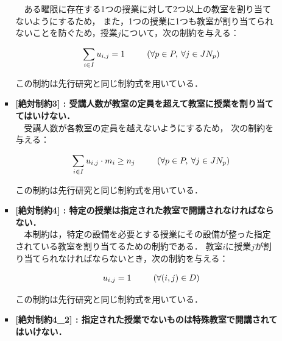 \documentclass[12pt, a4paper, fleqn]{jreport}
\begin{document}
\begin{itemize}
\begin{itemize}
\begin{itemize}
\vspace{-5.0mm}
　ある曜限に存在する1つの授業に対して2つ以上の教室を割り当てないようにするため，
また，1つの授業に1つも教室が割り当てられないことを防ぐため，授業$j$について，次の制約を与える：

\vspace{-3.0mm}
\begin{eqnarray}
\label{hzettai2} 
&&\sum_{i \in I} u_{i,j} = 1 \hspace{5.0mm}
\quad \left (\forall p \in P, \: \forall j \in JN_{p} \right)
\end{eqnarray} 

\vspace{5.0mm}
この制約は先行研究と同じ制約式を用いている．
\vspace{3.0mm}
\item {\bf  [絶対制約3] : 受講人数が教室の定員を超えて教室に授業を割り当ててはいけない．}\\

\vspace{-5.0mm}
　受講人数が各教室の定員を越えないようにするため，
次の制約を与える：

\vspace{-3.0mm}
\begin{eqnarray}
\label{hzettai3} 
&&\sum_{i \in I} u_{i,j}\cdot m_{i} \geq n_{j} \hspace{5.0mm}
\quad \left (\forall p \in P, \: \forall j \in JN_{p}\right)
\end{eqnarray}

\vspace{5.0mm}
この制約は先行研究と同じ制約式を用いている．
\vspace{3.0mm}
\item {\bf  [絶対制約4] : 特定の授業は指定された教室で開講されなければならない．}\\

\vspace{-5.0mm}
　本制約は，特定の設備を必要とする授業にその設備が整った指定されている教室を割り当てるための制約である．
教室$i$に授業$j$が割り当てられなければならないとき，次の制約を与える：

\vspace{-3.0mm}
\label{hzettai4} 
\begin{eqnarray}
&&u_{i,j} = 1 \hspace{5.0mm}
\quad \left(\forall (i,j) \in D\right)
\end{eqnarray}

\vspace{5.0mm}
この制約は先行研究と同じ制約式を用いている．
\vspace{3.0mm}
\item {\bf  [絶対制約4\_2] : 指定された授業でないものは特殊教室で開講されてはいけない．}\\


\end{itemize}
\end{itemize}
\end{itemize}
\end{document}
